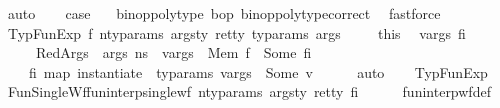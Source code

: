 \begin{isabellebody}
\ auto\isanewline
\ \ \isamarkupfalse%
\ {\isacharquery}{\kern0pt}case\ \isamarkupfalse%
\ \ {\isacartoucheopen}binop{\isacharunderscore}{\kern0pt}poly{\isacharunderscore}{\kern0pt}type\ bop{\isacartoucheclose}\ binop{\isacharunderscore}{\kern0pt}poly{\isacharunderscore}{\kern0pt}type{\isacharunderscore}{\kern0pt}correct\ \isamarkupfalse%
\ fastforce\isanewline
\isanewline
{}\isamarkupfalse%
\isanewline
\ \ \isamarkupfalse%
\ {\isacharparenleft}{\kern0pt}TypFunExp\ f\ n{\isacharunderscore}{\kern0pt}ty{\isacharunderscore}{\kern0pt}params\ args{\isacharunderscore}{\kern0pt}ty\ ret{\isacharunderscore}{\kern0pt}ty\ ty{\isacharunderscore}{\kern0pt}params\ args\ {\isasymDelta}{\isacharparenright}{\kern0pt}\isanewline
\ \ \isamarkupfalse%
\ this\ \isamarkupfalse%
\ vargs\ fi\ \isanewline
\ \ \ \ \ RedArgs{\isacharcolon}{\kern0pt}{\isachardoublequoteopen}{\isasymLambda}{\isacharcomma}{\kern0pt}{\isasymGamma}{\isacharcomma}{\kern0pt}{\isasymOmega}\ {\isasymturnstile}\ {\isasymlangle}args{\isacharcomma}{\kern0pt}\ n{\isacharunderscore}{\kern0pt}s{\isasymrangle}\ {\isacharbrackleft}{\kern0pt}{\isasymDown}{\isacharbrackright}{\kern0pt}\ vargs{\isachardoublequoteclose}\ \ Mem{\isasymGamma}{\isacharcolon}{\kern0pt}{\isachardoublequoteopen}{\isasymGamma}\ f\ {\isacharequal}{\kern0pt}\ Some\ fi{\isachardoublequoteclose}\ \ \ \ \ \ \isanewline
\ \ \ \ {\isachardoublequoteopen}fi\ {\isacharparenleft}{\kern0pt}map\ {\isacharparenleft}{\kern0pt}instantiate\ {\isasymOmega}{\isacharparenright}{\kern0pt}\ ty{\isacharunderscore}{\kern0pt}params{\isacharparenright}{\kern0pt}\ vargs\ {\isacharequal}{\kern0pt}\ Some\ v{\isachardoublequoteclose}\isanewline
\ \ \ \ \isamarkupfalse%
\ auto\isanewline
\ \ \isamarkupfalse%
\ TypFunExp\ \isamarkupfalse%
\ FunSingleWf{\isacharcolon}{\kern0pt}{\isachardoublequoteopen}fun{\isacharunderscore}{\kern0pt}interp{\isacharunderscore}{\kern0pt}single{\isacharunderscore}{\kern0pt}wf\ {\isacharparenleft}{\kern0pt}n{\isacharunderscore}{\kern0pt}ty{\isacharunderscore}{\kern0pt}params{\isacharcomma}{\kern0pt}\ args{\isacharunderscore}{\kern0pt}ty{\isacharcomma}{\kern0pt}\ ret{\isacharunderscore}{\kern0pt}ty{\isacharparenright}{\kern0pt}\ fi{\isachardoublequoteclose}\isanewline
\ \ \ \ \isamarkupfalse%
\ fun{\isacharunderscore}{\kern0pt}interp{\isacharunderscore}{\kern0pt}wf{\isacharunderscore}{\kern0pt}def\ \isamarkupfalse%

\end{isabellebody}
